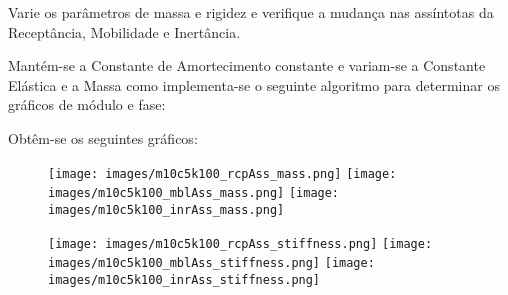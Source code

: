 \documentclass{article}
\begin{document}
\newpage
\begin{exercise}\label{ex7}
    Varie os parâmetros de massa e rigidez e verifique a mudança nas assíntotas da Receptância, Mobilidade e Inertância.
\end{exercise}
\begin{resolution}
    \noindent Mantém-se a Constante de Amortecimento constante e variam-se a Constante Elástica e a Massa como implementa-se o seguinte algoritmo para determinar os gráficos de módulo e fase:
    \begin{scriptsize}
        \myMatlab
    \end{scriptsize}
    Obtêm-se os seguintes gráficos:
    \begin{figure}[H]
        \centering
        \texttt{[image: images/m10c5k100\_rcpAss\_mass.png]}
        \texttt{[image: images/m10c5k100\_mblAss\_mass.png]}
        \texttt{[image: images/m10c5k100\_inrAss\_mass.png]}
    \end{figure}
    \begin{figure}[H]
        \centering
        \texttt{[image: images/m10c5k100\_rcpAss\_stiffness.png]}
        \texttt{[image: images/m10c5k100\_mblAss\_stiffness.png]}
        \texttt{[image: images/m10c5k100\_inrAss\_stiffness.png]}
    \end{figure}
\end{resolution}
\end{document}
